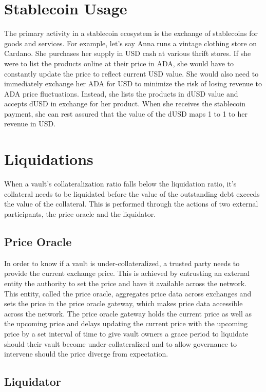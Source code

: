 \documentclass[12pt]{article}
\begin{document}
\section{Stablecoin Usage}

The primary activity in a stablecoin ecosystem is the exchange of stablecoins for goods and services. For example, let's say Anna runs a vintage clothing store on Cardano. She purchases her supply in USD cash at various thrift stores. If she were to list the products online at their price in ADA, she would have to constantly update the price to reflect current USD value. She would also need to immediately exchange her ADA for USD to minimize the risk of losing revenue to ADA price fluctuations. Instead, she lists the products in dUSD value and accepts dUSD in exchange for her product. When she receives the stablecoin payment, she can rest assured that the value of the dUSD maps 1 to 1 to her revenue in USD.

\section{Liquidations}
When a vault's collateralization ratio falls below the liquidation ratio, it's collateral needs to be liquidated before the value of the outstanding debt exceeds the value of the collateral. This is performed through the actions of two external participants, the price oracle and the liquidator.

\subsection{Price Oracle}
In order to know if a vault is under-collateralized, a trusted party needs to provide the current exchange price. This is achieved by entrusting an external entity the authority to set the price and have it available across the network. This entity, called the price oracle, aggregates price data across exchanges and sets the price in the price oracle gateway, which makes price data accessible across the network. The price oracle gateway holds the current price as well as the upcoming price and delays updating the current price with the upcoming price by a set interval of time to give vault owners a grace period to liquidate should their vault become under-collateralized and to allow governance to intervene should the price diverge from expectation.

\subsection{Liquidator}
\end{document}
